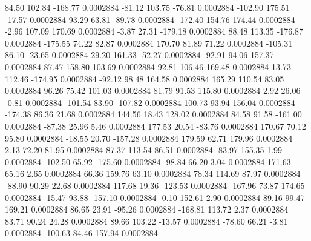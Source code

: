        84.50      102.84     -168.77     0.0002884
      -81.12      103.75      -76.81     0.0002884
     -102.90      175.51      -17.57     0.0002884
       93.29       63.81      -89.78     0.0002884
     -172.40      154.76      174.44     0.0002884
       -2.96      107.09      170.69     0.0002884
       -3.87       27.31     -179.18     0.0002884
       88.48      113.35     -176.87     0.0002884
     -175.55       74.22       82.87     0.0002884
      170.70       81.89       71.22     0.0002884
     -105.31       86.10      -23.65     0.0002884
       29.20      161.33      -52.27     0.0002884
      -92.91       94.06      157.37     0.0002884
       87.47      158.80      103.69     0.0002884
       92.81      106.46      169.48     0.0002884
       13.73      112.46     -174.95     0.0002884
      -92.12       98.48      164.58     0.0002884
      165.29      110.54       83.05     0.0002884
       96.26       75.42      101.03     0.0002884
       81.79       91.53      115.80     0.0002884
        2.92       26.06       -0.81     0.0002884
     -101.54       83.90     -107.82     0.0002884
      100.73       93.94      156.04     0.0002884
     -174.38       86.36       21.68     0.0002884
      144.56       18.43      128.02     0.0002884
       84.58       91.58     -161.00     0.0002884
      -87.38       25.96        5.46     0.0002884
      177.53       20.54      -83.76     0.0002884
      170.67       70.12       95.80     0.0002884
      -18.55       20.70     -157.28     0.0002884
      179.59       62.71      179.96     0.0002884
        2.13       72.20       81.95     0.0002884
       87.37      113.54       86.51     0.0002884
      -83.97      155.35        1.99     0.0002884
     -102.50       65.92     -175.60     0.0002884
      -98.84       66.20        3.04     0.0002884
      171.63       65.16        2.65     0.0002884
       66.36      159.76       63.10     0.0002884
       78.34      114.69       87.97     0.0002884
      -88.90       90.29       22.68     0.0002884
      117.68       19.36     -123.53     0.0002884
     -167.96       73.87      174.65     0.0002884
      -15.47       93.88     -157.10     0.0002884
       -0.10      152.61        2.90     0.0002884
       89.16       99.47      169.21     0.0002884
       86.65       23.91      -95.26     0.0002884
     -168.81      113.72        2.37     0.0002884
       83.71       90.24       24.28     0.0002884
       89.66      103.22      -13.57     0.0002884
      -78.60       66.21       -3.81     0.0002884
     -100.63       84.46      157.94     0.0002884
